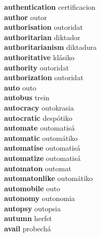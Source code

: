 \textbf{authentication } certificacion \\
\textbf{author } outor \\
\textbf{authorisation } outoridat \\
\textbf{authoritarian } diktador \\
\textbf{authoritarianism } diktadura \\
\textbf{authoritative } klásiko \\
\textbf{authority } outoridat \\
\textbf{authorization } outoridat \\
\textbf{auto } outo \\
\textbf{autobus } trein \\
\textbf{autocracy } outokrasia \\
\textbf{autocratic } despótiko \\
\textbf{automate } outomatisá \\
\textbf{automatic } outomátiko \\
\textbf{automatise } outomatisá \\
\textbf{automatize } outomatisá \\
\textbf{automaton } outomat \\
\textbf{automatonlike } outomátiko \\
\textbf{automobile } outo \\
\textbf{autonomy } outonomia \\
\textbf{autopsy } outopsia \\
\textbf{autumn } herfst \\
\textbf{avail } probechá \\
